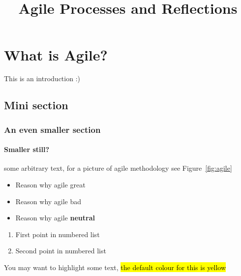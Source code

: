 \documentclass[11pt]{article}
\title{Agile Processes and Reflections}
\author{}
\begin{document}
\maketitle
\tableofcontents %
\listoffigures %
\section{What is Agile?}

This is an introduction  :) 
\subsection{Mini section}
\subsubsection{An even smaller section}
\paragraph{Smaller still?}
some arbitrary text, for a picture of agile methodology see Figure~\ref{fig:agile}

\begin{itemize}
\item Reason why agile great
\item Reason why agile bad
\item Reason why agile \textbf{neutral}
\end{itemize}

\begin{enumerate}
\item First point in numbered list
\item Second point in numbered list
\end{enumerate}

You may want to highlight some text, \hl{the default colour for this is yellow}
\end{document}
